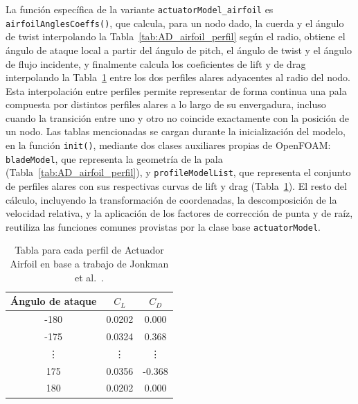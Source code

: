 La función específica de la variante \texttt{actuatorModel\_airfoil} es \texttt{airfoilAnglesCoeffs()}, que calcula, para un nodo dado, la cuerda y el ángulo de twist interpolando la Tabla~\ref{tab:AD_airfoil_perfil} según el radio, obtiene el ángulo de ataque local a partir del ángulo de pitch, el ángulo de twist y el ángulo de flujo incidente, y finalmente calcula los coeficientes de lift y de drag interpolando la Tabla~\ref{tab:AD_airfoil_polar} entre los dos perfiles alares adyacentes al radio del nodo. Esta interpolación entre perfiles permite representar de forma continua una pala compuesta por distintos perfiles alares a lo largo de su envergadura, incluso cuando la transición entre uno y otro no coincide exactamente con la posición de un nodo. Las tablas mencionadas se cargan durante la inicialización del modelo, en la función \texttt{init()}, mediante dos clases auxiliares propias de OpenFOAM: \texttt{bladeModel}, que representa la geometría de la pala (Tabla~\ref{tab:AD_airfoil_perfil}), y \texttt{profileModelList}, que representa el conjunto de perfiles alares con sus respectivas curvas de lift y drag (Tabla~\ref{tab:AD_airfoil_polar}). El resto del cálculo, incluyendo la transformación de coordenadas, la descomposición de la velocidad relativa, y la aplicación de los factores de corrección de punta y de raíz, reutiliza las funciones comunes provistas por la clase base \texttt{actuatorModel}.

\begin{table}[h]
\centering
\begin{tabular}{ccc}
\hline
Ángulo de ataque & $C_L$ & $C_D$ \\
\hline
-180 & 0.0202 & 0.000 \\
-175 & 0.0324 & 0.368 \\
\vdots & \vdots & \vdots \\
175 & 0.0356 & -0.368 \\
180 & 0.0202 & 0.000 \\
\hline
\end{tabular}
\caption{Tabla para cada perfil de Actuador Airfoil en base a trabajo de Jonkman et al.~\cite{jonkman2009}.}
\label{tab:AD_airfoil_polar}
\end{table}

